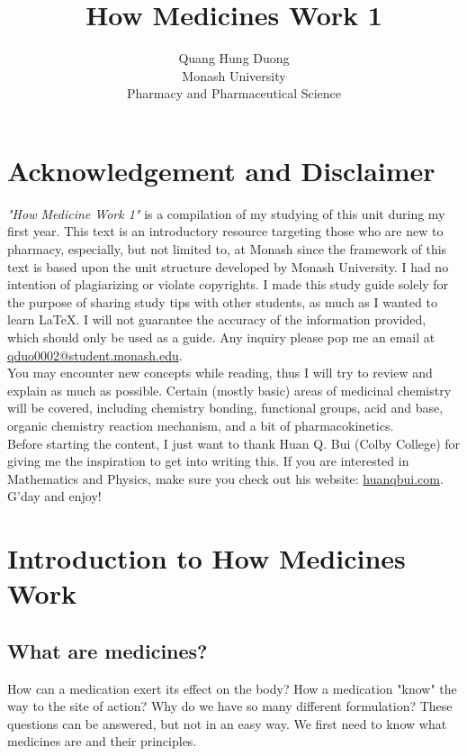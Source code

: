\documentclass{report}
\author{Quang Hung Duong\\
Monash University\\
Pharmacy and Pharmaceutical Science}
\title{\huge How Medicines Work 1}
\begin{document}
\maketitle

\tableofcontents
\listoffigures
\newpage

\section{Acknowledgement and Disclaimer}
	\textit{"How Medicine Work 1"} is a compilation of my studying of this unit during my first year. This text is an introductory resource targeting those who are new to pharmacy, especially, but not limited to, at Monash since the framework of this text is based upon the unit structure developed by Monash University. I had no intention of plagiarizing or violate copyrights. I made this study guide solely for the purpose of sharing study tips with other students, as much as I wanted to learn \LaTeX. I will not guarantee the accuracy of the information provided, which should only be used as a guide. Any inquiry please pop me an email at \href{mailto:qduo0002@student.monash.edu}{qduo0002@student.monash.edu}. \\
	
	You may encounter new concepts while reading, thus I will try to review and explain as much as possible. Certain (mostly basic) areas of medicinal chemistry will be covered, including chemistry bonding, functional groups, acid and base, organic chemistry reaction mechanism, and a bit of pharmacokinetics. \\
	
	Before starting the content, I just want to thank Huan Q. Bui (Colby College) for giving me the inspiration to get into writing this. If you are interested in Mathematics and Physics, make sure you check out his website: \href{http://huanqbui.com/}{huanqbui.com}. \\
	
	G'day and enjoy!
\newpage
	
\section{Introduction to How Medicines Work}
	\subsection{What are medicines?}
		How can a medication exert its effect on the body? How a medication "know" the way to the site of action? Why do we have so many different formulation? These questions can be answered, but not in an easy way. We first need to know what medicines are and their principles. \\
	
\end{document}
